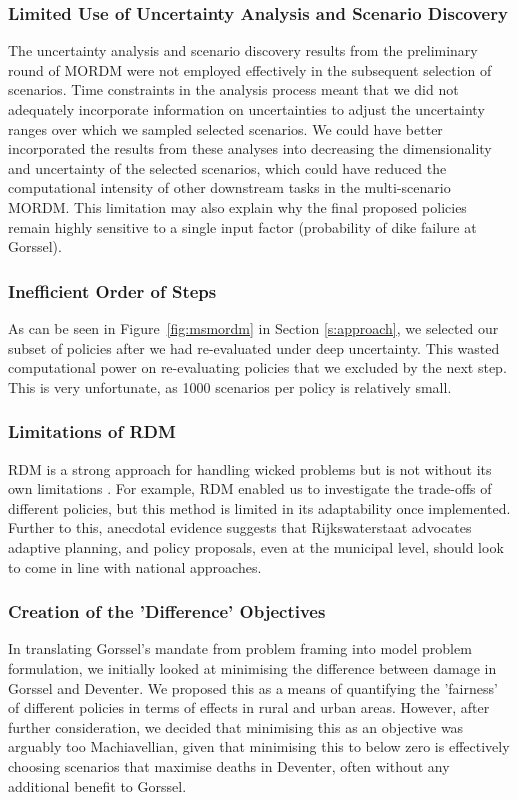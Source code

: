 \subsubsection{Limited Use of Uncertainty Analysis and Scenario Discovery}
The uncertainty analysis and scenario discovery results from the preliminary round of MORDM were not employed effectively in the subsequent selection of scenarios. Time constraints in the analysis process meant that we did not adequately incorporate information on uncertainties to adjust the uncertainty ranges over which we sampled selected scenarios. We could have better incorporated the results from these analyses into decreasing the dimensionality and uncertainty of the selected scenarios, which could have reduced the computational intensity of other downstream tasks in the multi-scenario MORDM. This limitation may also explain why the final proposed policies remain highly sensitive to a single input factor (probability of dike failure at Gorssel).

\subsubsection{Inefficient Order of Steps}
As can be seen in Figure~\ref{fig:msmordm} in Section \ref{s:approach}, we selected our subset of policies after we had re-evaluated under deep uncertainty. This wasted computational power on re-evaluating policies that we excluded by the next step. This is very unfortunate, as 1000 scenarios per policy is relatively small.

\subsubsection{Limitations of RDM}
RDM is a strong approach for handling wicked problems but is not without its own limitations \parencite{kwakkel_coping_2016}. For example, RDM enabled us to investigate the trade-offs of different policies, but this method is limited in its adaptability once implemented. Further to this, anecdotal evidence suggests that Rijkswaterstaat advocates adaptive planning, and policy proposals, even at the municipal level, should look to come in line with national approaches.

\subsubsection{Creation of the 'Difference' Objectives}
In translating Gorssel's mandate from problem framing into model problem formulation, we initially looked at minimising the difference between damage in Gorssel and Deventer. We proposed this as a means of quantifying the 'fairness' of different policies in terms of effects in rural and urban areas. However, after further consideration, we decided that minimising this as an objective was arguably too Machiavellian, given that minimising this to below zero is effectively choosing scenarios that maximise deaths in Deventer, often without any additional benefit to Gorssel.

